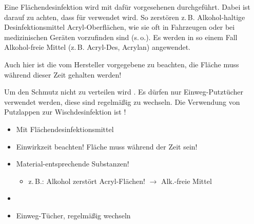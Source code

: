 {%
Eine Flächendesinfektion wird mit dafür vorgesehenen
 durchgeführt. Dabei ist
darauf zu achten, dass für  verwendet wird. So zerstören z.\,B.
Alkohol-haltige Desinfektionsmittel Acryl-Oberflächen, wie
sie oft in Fahrzeugen oder bei medizinischen Geräten
vorzufinden sind (s.\,o.). Es werden in so einem Fall
Alkohol-freie Mittel (z.\,B. Acryl-Des{\texttrademark},
Acrylan{\texttrademark}) angewendet.

Auch hier ist die vom Hersteller vorgegebene
 zu beachten, die Fläche muss während dieser
Zeit  gehalten werden!

Um den Schmutz nicht zu verteilen wird . Es dürfen nur
Einweg-Putztücher verwendet werden, diese sind regelmäßig zu
wechseln. Die Verwendung von Putzlappen zur
Wischdesinfektion ist !


}{
\begin{itemize}
  \item Mit Flächendesinfektionsmittel
  \item Einwirkzeit beachten! Fläche muss während der Zeit
   sein!
  \item Material-entsprechende Substanzen!
  \begin{itemize}
    \item z.\,B.: Alkohol zerstört Acryl-Flächen! ${\rightarrow}$
    Alk.-freie Mittel
  \end{itemize}
  \item {}
  \item Einweg-Tücher, regelmäßig wechseln
\end{itemize}
}{}{}{}

